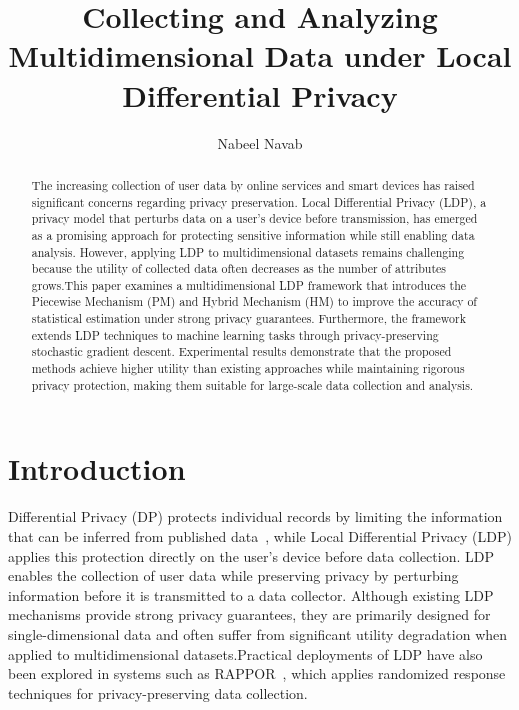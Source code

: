 \documentclass[sigconf]{acmart}
\begin{document}
\title{Collecting and Analyzing Multidimensional Data under Local Differential Privacy}

\author{Nabeel Navab}

\begin{abstract}
The increasing collection of user data by online services and smart devices has raised significant concerns regarding privacy preservation. Local Differential Privacy (LDP), a privacy model that perturbs data on a user's device before transmission, has emerged as a promising approach for protecting sensitive information while still enabling data analysis. However, applying LDP to multidimensional datasets remains challenging because the utility of collected data often decreases as the number of attributes grows.This paper examines a multidimensional LDP framework that introduces the Piecewise Mechanism (PM) and Hybrid Mechanism (HM) to improve the accuracy of statistical estimation under strong privacy guarantees. Furthermore, the framework extends LDP techniques to machine learning tasks through privacy-preserving stochastic gradient descent. Experimental results demonstrate that the proposed methods achieve higher utility than existing approaches while maintaining rigorous privacy protection, making them suitable for large-scale data collection and analysis.



\end{abstract} 

\maketitle

\section{Introduction}

Differential Privacy (DP) protects individual records by limiting the information that can be inferred from published data~\cite{dwork2006}, while Local Differential Privacy (LDP) applies this protection directly on the user's device before data collection. LDP enables the collection of user data while preserving privacy by perturbing information before it is transmitted to a data collector.
 Although existing LDP mechanisms provide strong privacy guarantees, they are primarily designed for single-dimensional data and often suffer from significant utility degradation when applied to multidimensional datasets.Practical deployments of LDP have also been explored in systems such as RAPPOR~\cite{rappor2014}, which applies randomized response techniques for privacy-preserving data collection.
\end{document}
